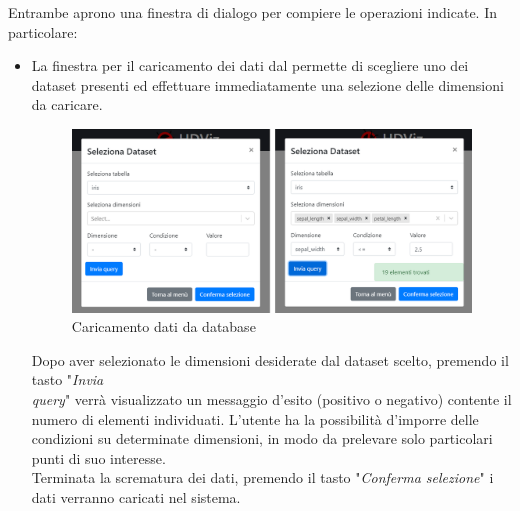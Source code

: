 \newpage
Entrambe aprono una finestra di dialogo per compiere le operazioni indicate. In particolare:
\begin{itemize}
	\item La finestra per il caricamento dei dati dal  permette di scegliere uno dei dataset presenti ed effettuare immediatamente una selezione delle dimensioni da caricare.
	
	\begin{figure}[H]
		\includegraphics[scale=0.6]{Images/double.png}
		\centering
		\caption{Caricamento dati da database}
	\end{figure}
	
Dopo aver selezionato le dimensioni desiderate dal dataset scelto, premendo il tasto "\textit{Invia\\ query}" verrà visualizzato un messaggio d'esito (positivo o negativo) contente il numero di elementi individuati. L'utente ha la possibilità d'imporre delle condizioni su determinate dimensioni, in modo da prelevare solo particolari punti di suo interesse.\\ Terminata la scrematura dei dati, premendo il tasto "\textit{Conferma selezione}" i dati verranno caricati nel sistema. 
	

\end{itemize}
